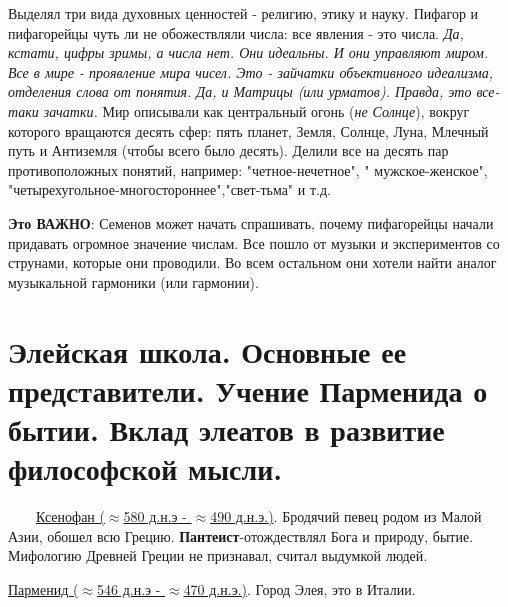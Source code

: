 Выделял три вида духовных ценностей - религию, этику и науку. Пифагор и пифагорейцы чуть ли не обожествляли числа: все явления - это числа. \textit{Да, кстати, цифры зримы, а числа нет. Они идеальны. И они управляют миром. Все в мире - проявление мира чисел. Это - зайчатки объективного идеализма, отделения слова от понятия. Да, и Матрицы (или урматов). Правда, это все-таки зачатки.} Мир описывали как центральный огонь (\textit{не Солнце}), вокруг которого вращаются десять сфер: пять планет, Земля, Солнце, Луна, Млечный путь и Антиземля (чтобы всего было десять). Делили все на десять пар противоположных понятий, например: "четное-нечетное", " мужское-женское", "четырехугольное-многостороннее","свет-тьма" и т.д.

\textbf{Это ВАЖНО}: Семенов может начать спрашивать, почему пифагорейцы начали придавать огромное значение числам. Все пошло от музыки и экспериментов со струнами, которые они проводили. Во всем остальном они хотели найти аналог музыкальной гармоники (или гармонии).

\section{Элейская школа. Основные ее представители. Учение Парменида о бытии. Вклад элеатов в развитие философской мысли.}
\ \ \ \
\underline{Ксенофан ($\approx$580 д.н.э - $\approx$490 д.н.э.)}. Бродячий певец родом из Малой Азии, обошел всю Грецию. \textbf{Пантеист}-отождествлял Бога и природу, бытие. Мифологию Древней Греции не признавал, считал выдумкой людей.

\underline{Парменид ($\approx$546 д.н.э - $\approx$470 д.н.э.)}. Город Элея, это в Италии.


